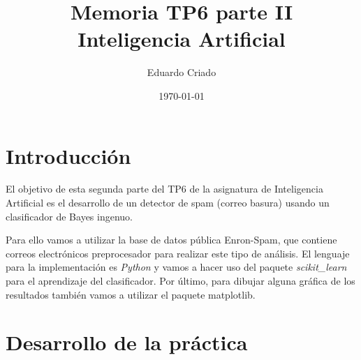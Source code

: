 \documentclass[12pt]{article}
\begin{document}
\title{Memoria TP6 parte II \\ Inteligencia Artificial}
\author{
        Eduardo Criado}
\date{\today}

\maketitle

\section{Introducci\'on}
El objetivo de esta segunda parte del TP6 de la asignatura de Inteligencia
Artificial es el desarrollo de un detector de spam (correo basura) usando
un clasificador de Bayes ingenuo.

Para ello vamos a utilizar la base de datos p\'ublica Enron-Spam, que contiene
correos electr\'onicos preprocesador para realizar este tipo de an\'alisis.
El lenguaje para la implementaci\'on es \textit{Python} y vamos a hacer uso del
paquete \textit{scikit\_learn} para el aprendizaje del clasificador.
Por \'ultimo, para dibujar alguna gr\'afica de los resultados tambi\'en vamos
a utilizar el paquete matplotlib.

\section{Desarrollo de la pr\'actica}
\end{document}
